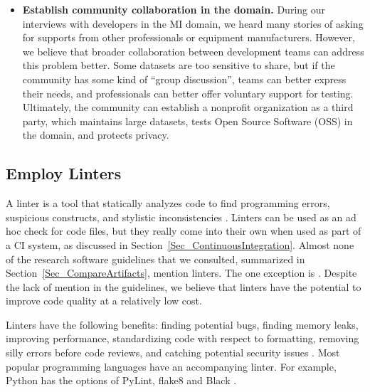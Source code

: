 \documentclass[final, 12pt, 3p, times]{elsarticle}
\begin{document}
\begin{itemize}
\item \textbf{Establish community collaboration in the domain.} During our
interviews with developers in the MI domain, we heard many stories of asking for
supports from other professionals or equipment manufacturers. However, we
believe that broader collaboration between development teams can address this
problem better. Some datasets are too sensitive to share, but if the community
has some kind of ``group discussion'', teams can better express their needs, and
professionals can better offer voluntary support for testing. Ultimately, the
community can establish a nonprofit organization as a third party, which
maintains large datasets, tests Open Source Software (OSS) in the domain, and
protects privacy. 

\end{itemize}

\subsection{Employ Linters} \label{Sec_Linters}

A linter is a tool that statically analyzes code to find programming errors,
suspicious constructs, and stylistic inconsistencies \cite{Wikipedia2022_Lint}.
Linters can be used as an ad hoc check for code files, but they really come into
their own when used as part of a CI system, as discussed in
Section~\ref{Sec_ContinuousIntegration}. Almost none of the research software
guidelines that we consulted, summarized in Section~\ref{Sec_CompareArtifacts},
mention linters.  The one exception is \cite{ThielEtAl2020}.  Despite the lack
of mention in the guidelines, we believe that linters have the potential to
improve code quality at a relatively low cost.  

Linters have the following benefits: finding potential bugs, finding memory
leaks, improving performance, standardizing code with respect to formatting,
removing silly errors before code reviews, and catching potential security
issues \cite{SourceLevel2022_Lint}. Most popular programming languages have an
accompanying linter.  For example, Python has the options of PyLint, flake8 and
Black \cite{Zadka2018}.
\end{document}
